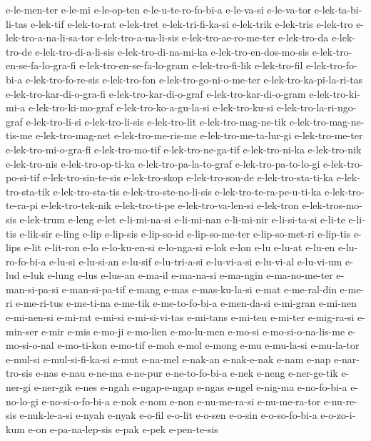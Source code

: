 {e-le-men-ter e-le-mi e-le-op-ten e-le-u-te-ro-fo-bi-a e-le-va-si
e-le-va-tor e-lek-ta-bi-li-tas e-lek-tif e-lek-to-rat e-lek-tret
e-lek-tri-fi-ka-si e-lek-trik e-lek-tris e-lek-tro
e-lek-tro-a-na-li-sa-tor e-lek-tro-a-na-li-sis e-lek-tro-ae-ro-me-ter
e-lek-tro-da e-lek-tro-de e-lek-tro-di-a-li-sis e-lek-tro-di-na-mi-ka
e-lek-tro-en-dos-mo-sis e-lek-tro-en-se-fa-lo-gra-fi
e-lek-tro-en-se-fa-lo-gram e-lek-tro-fi-lik e-lek-tro-fil
e-lek-tro-fo-bi-a e-lek-tro-fo-re-sis e-lek-tro-fon
e-lek-tro-go-ni-o-me-ter e-lek-tro-ka-pi-la-ri-tas
e-lek-tro-kar-di-o-gra-fi e-lek-tro-kar-di-o-graf e-lek-tro-kar-di-o-gram
e-lek-tro-ki-mi-a e-lek-tro-ki-mo-graf e-lek-tro-ko-a-gu-la-si
e-lek-tro-ku-si e-lek-tro-la-ri-ngo-graf e-lek-tro-li-si e-lek-tro-li-sis
e-lek-tro-lit e-lek-tro-mag-ne-tik e-lek-tro-mag-ne-tis-me
e-lek-tro-mag-net e-lek-tro-me-ris-me e-lek-tro-me-ta-lur-gi
e-lek-tro-me-ter e-lek-tro-mi-o-gra-fi e-lek-tro-mo-tif
e-lek-tro-ne-ga-tif e-lek-tro-ni-ka e-lek-tro-nik e-lek-tro-nis
e-lek-tro-op-ti-ka e-lek-tro-pa-la-to-graf e-lek-tro-pa-to-lo-gi
e-lek-tro-po-si-tif e-lek-tro-sin-te-sis e-lek-tro-skop e-lek-tro-son-de
e-lek-tro-sta-ti-ka e-lek-tro-sta-tik e-lek-tro-sta-tis
e-lek-tro-ste-no-li-sis e-lek-tro-te-ra-pe-u-ti-ka e-lek-tro-te-ra-pi
e-lek-tro-tek-nik e-lek-tro-ti-pe e-lek-tro-va-len-si e-lek-tron
e-lek-tros-mo-sis e-lek-trum e-leng e-let e-li-mi-na-si e-li-mi-nan
e-li-mi-nir e-li-si-ta-si e-li-te e-li-tis e-lik-sir e-ling e-lip
e-lip-sis e-lip-so-id e-lip-so-me-ter e-lip-so-met-ri e-lip-tis e-lips
e-lit e-lit-ron e-lo e-lo-ku-en-si e-lo-nga-si e-lok e-lon e-lu e-lu-at
e-lu-en e-lu-ro-fo-bi-a e-lu-si e-lu-si-an e-lu-sif e-lu-tri-a-si
e-lu-vi-a-si e-lu-vi-al e-lu-vi-um e-lud e-luk e-lung e-lus e-lus-an
e-ma-il e-ma-na-si e-ma-ngin e-ma-no-me-ter e-man-si-pa-si e-man-si-pa-tif
e-mang e-mas e-mas-ku-la-si e-mat e-me-ral-din e-me-ri e-me-ri-tus
e-me-ti-na e-me-tik e-me-to-fo-bi-a e-men-da-si e-mi-gran e-mi-nen
e-mi-nen-si e-mi-rat e-mi-si e-mi-si-vi-tas e-mi-tans e-mi-ten e-mi-ter
e-mig-ra-si e-min-ser e-mir e-mis e-mo-ji e-mo-lien e-mo-lu-men e-mo-si
e-mo-si-o-na-lis-me e-mo-si-o-nal e-mo-ti-kon e-mo-tif e-moh e-mol e-mong
e-mu e-mu-la-si e-mu-la-tor e-mul-si e-mul-si-fi-ka-si e-mut e-na-mel
e-nak-an e-nak-e-nak e-nam e-nap e-nar-tro-sis e-nas e-nau e-ne-ma
e-ne-pur e-ne-to-fo-bi-a e-nek e-neng e-ner-ge-tik e-ner-gi e-ner-gik
e-nes e-ngah e-ngap-e-ngap e-ngas e-ngel e-nig-ma e-no-fo-bi-a e-no-lo-gi
e-no-si-o-fo-bi-a e-nok e-nom e-non e-nu-me-ra-si e-nu-me-ra-tor
e-nu-re-sis e-nuk-le-a-si e-nyah e-nyak e-o-fil e-o-lit e-o-sen e-o-sin
e-o-so-fo-bi-a e-o-zo-i-kum e-on e-pa-na-lep-sis e-pak e-pek e-pen-te-sis
}
